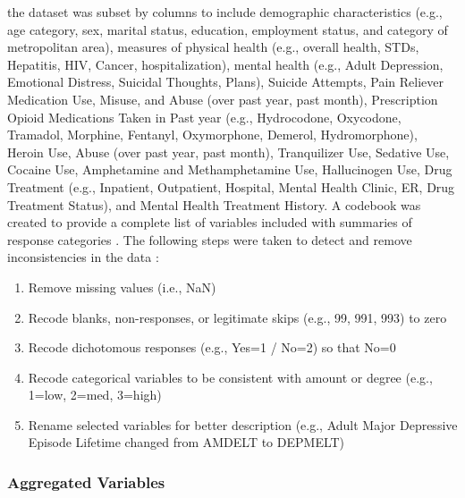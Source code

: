 \documentclass[sigconf]{acmart}
\begin{document}
the 
dataset was subset by columns to include demographic characteristics (e.g., 
age category, sex, marital status, education, employment status, and category 
of metropolitan area), measures of physical health (e.g., overall health, 
STDs, Hepatitis, HIV, Cancer, hospitalization), mental health (e.g., Adult 
Depression, Emotional Distress, Suicidal Thoughts, Plans), Suicide Attempts, 
Pain Reliever Medication Use, Misuse, and Abuse (over past year, past month), 
Prescription Opioid Medications Taken in Past year (e.g., Hydrocodone, 
Oxycodone, Tramadol, Morphine, Fentanyl, Oxymorphone, Demerol, Hydromorphone), 
Heroin Use, Abuse (over past year, past month), Tranquilizer Use, Sedative Use, 
Cocaine Use, Amphetamine and Methamphetamine Use, Hallucinogen Use, Drug 
Treatment (e.g., Inpatient, Outpatient, Hospital, Mental Health Clinic, ER, 
Drug Treatment Status), and Mental Health Treatment History. A codebook was 
created to provide a complete list of variables included with summaries 
of response categories \cite{codebook17}. The following steps were taken 
to detect and remove inconsistencies in the data \cite{rahm00}:
\begin{enumerate}
  \item Remove missing values (i.e., NaN) 
  \item Recode blanks, non-responses, or legitimate skips (e.g., 99, 991, 
  993) to zero  
  \item Recode dichotomous responses (e.g., Yes=1 / No=2) so that No=0
  \item Recode categorical variables to be consistent with amount or degree 
  (e.g., 1=low, 2=med, 3=high)
   \item Rename selected variables for better description (e.g., 
   Adult Major Depressive Episode Lifetime changed from AMDELT to DEPMELT)
\end{enumerate}

\subsubsection{Aggregated Variables}
\end{document}
